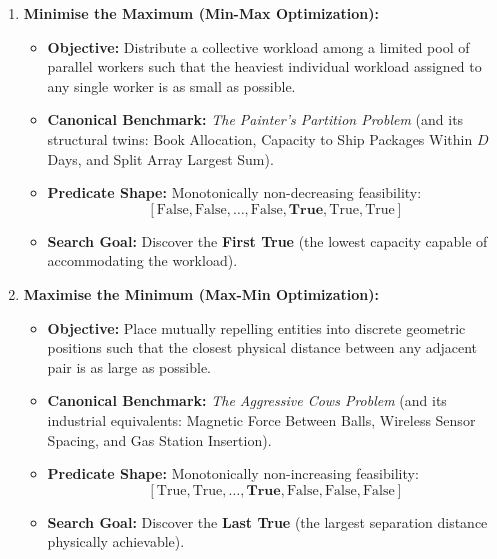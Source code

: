 \documentclass[10pt,journal,compsoc,onecolumn]{IEEEtran}
\begin{document}
\begin{enumerate}
    \item \textbf{Minimise the Maximum (Min-Max Optimization):}
    \begin{itemize}
        \item \textbf{Objective:} Distribute a collective workload among a limited pool of parallel workers such that the heaviest individual workload assigned to any single worker is as small as possible.
        \item \textbf{Canonical Benchmark:} \emph{The Painter's Partition Problem} (and its structural twins: Book Allocation, Capacity to Ship Packages Within $D$ Days, and Split Array Largest Sum).
        \item \textbf{Predicate Shape:} Monotonically non-decreasing feasibility:
        \[
        [\text{False}, \text{False}, \dots, \text{False}, \mathbf{True}, \text{True}, \text{True}]
        \]
        \item \textbf{Search Goal:} Discover the \textbf{First True} (the lowest capacity capable of accommodating the workload).
    \end{itemize}

    \item \textbf{Maximise the Minimum (Max-Min Optimization):}
    \begin{itemize}
        \item \textbf{Objective:} Place mutually repelling entities into discrete geometric positions such that the closest physical distance between any adjacent pair is as large as possible.
        \item \textbf{Canonical Benchmark:} \emph{The Aggressive Cows Problem} (and its industrial equivalents: Magnetic Force Between Balls, Wireless Sensor Spacing, and Gas Station Insertion).
        \item \textbf{Predicate Shape:} Monotonically non-increasing feasibility:
        \[
        [\text{True}, \text{True}, \dots, \mathbf{True}, \text{False}, \text{False}, \text{False}]
        \]
        \item \textbf{Search Goal:} Discover the \textbf{Last True} (the largest separation distance physically achievable).
    \end{itemize}
\end{enumerate}
\end{document}
